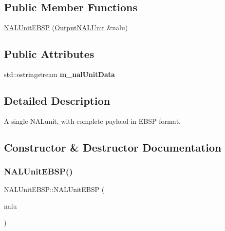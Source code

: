 \subsection*{Public Member Functions}
{\bf }\par
\begin{DoxyCompactItemize}
\item 
\hyperlink{struct_n_a_l_unit_e_b_s_p_a57fe5aeb0568830923c3d7f00052cccf}{N\+A\+L\+Unit\+E\+B\+SP} (\hyperlink{struct_output_n_a_l_unit}{Output\+N\+A\+L\+Unit} \&nalu)
\end{DoxyCompactItemize}

\subsection*{Public Attributes}
\begin{DoxyCompactItemize}
\item 
\mbox{\label{struct_n_a_l_unit_e_b_s_p_a5066d41cf931afb3dd8341c1ced30ab6}} 
std\+::ostringstream {\bfseries m\+\_\+nal\+Unit\+Data}
\end{DoxyCompactItemize}


\subsection{Detailed Description}
A single N\+A\+Lunit, with complete payload in E\+B\+SP format. 

\subsection{Constructor \& Destructor Documentation}
\mbox{\label{struct_n_a_l_unit_e_b_s_p_a57fe5aeb0568830923c3d7f00052cccf}} 
\subsubsection{\texorpdfstring{N\+A\+L\+Unit\+E\+B\+S\+P()}{NALUnitEBSP()}}
{\footnotesize\ttfamily N\+A\+L\+Unit\+E\+B\+S\+P\+::\+N\+A\+L\+Unit\+E\+B\+SP (\begin{DoxyParamCaption}\item[{\hyperlink{struct_output_n_a_l_unit}{Output\+N\+A\+L\+Unit} \&}]{nalu }\end{DoxyParamCaption})\hspace{0.3cm}{\ttfamily [inline]}}

